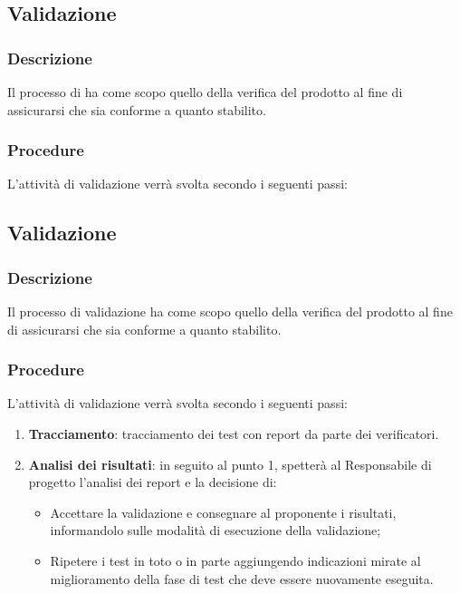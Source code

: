 \subsection{Validazione}
\label{sec:validazione}
\subsubsection{Descrizione}
Il processo di  ha come scopo quello della verifica del prodotto al fine di assicurarsi che sia conforme a quanto stabilito.
\subsubsection{Procedure}
L’attività di validazione verrà svolta secondo i seguenti passi:
\subsection{Validazione}
\label{sec:validazione}
\subsubsection{Descrizione}
Il processo di validazione ha come scopo quello della verifica del prodotto al fine di assicurarsi che sia conforme a quanto stabilito.
\subsubsection{Procedure}
L’attività di validazione verrà svolta secondo i seguenti passi:
\begin{enumerate} 
    \item \textbf{Tracciamento}: tracciamento dei test con report da parte dei verificatori.
    \item \textbf{Analisi dei risultati}: in seguito al punto 1, spetterà al Responsabile di progetto l’analisi dei report e la decisione di:
    \begin{itemize}
        \item Accettare la validazione e consegnare al proponente i risultati, informandolo sulle modalità di esecuzione della validazione;
        \item Ripetere i test in toto o in parte aggiungendo indicazioni mirate al miglioramento della fase di test che deve essere nuovamente eseguita.
    \end{itemize}
\end{enumerate}

